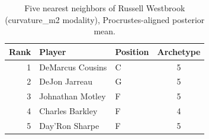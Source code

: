 \begin{table}[htbp]
  \centering\small
  \begin{tabular}{rllc}
    \toprule
    Rank & Player & Position & Archetype \\
    \midrule
    1 & DeMarcus Cousins & C & 5 \\
    2 & DeJon Jarreau & G & 5 \\
    3 & Johnathan Motley & F & 5 \\
    4 & Charles Barkley & F & 4 \\
    5 & Day'Ron Sharpe & F & 5 \\
    \bottomrule
  \end{tabular}
  \caption{Five nearest neighbors of Russell Westbrook (curvature_m2 modality), Procrustes-aligned posterior mean.}
  \label{tab:Russell_Westbrook_neighbors_curvature_m2}
\end{table}

